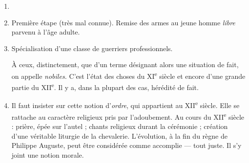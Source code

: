 \documentclass[french,twoside]{book} %
\newlength{\listmod}
\newcommand{\listhead}[1]{\hspace{-1\listmod}\emph{#1}}
\begin{document}
\begin{enumerate}[itemsep=\baselineskip,]
\item 
{}
\item Première étape (très mal connue). Remise des armes au jeune homme {\itshape libre} parvenu à l’âge adulte.
\item Spécialisation d’une classe de guerriers professionnels.\par

À ceux, distinctement, que d’un terme désignant alors une situation de fait, on appelle {\itshape nobiles.} C’est l’état des choses du XI\textsuperscript{e} siècle et encore d’une grande partie du XII\textsuperscript{e}. Il y a, dans la plupart des cas, hérédité de fait.\par
\label{p64}
\item Il faut insister sur cette notion d’{\itshape ordre}, qui appartient au XII\textsuperscript{e} siècle. Elle se rattache au caractère religieux pris par l’adoubement. Au cours du XII\textsuperscript{e} siècle : prière, épée sur l’autel ; chants religieux durant la cérémonie ; création d’une véritable liturgie de la chevalerie. L’évolution, à la fin du règne de Philippe Auguste, peut être considérée comme accomplie — tout juste. Il s’y joint une notion morale.\par


\end{enumerate}
\end{document}
